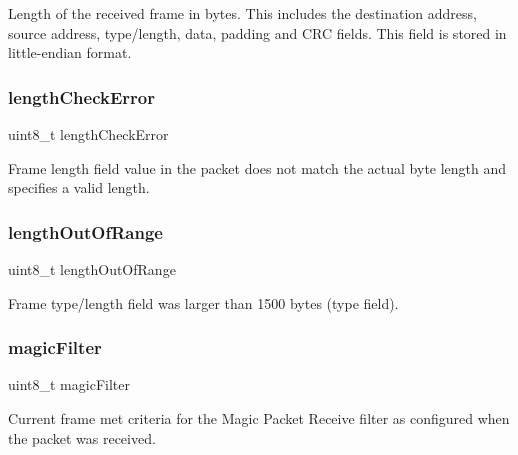 Length of the received frame in bytes. This includes the destination address, source address, type/length, data, padding and C\+RC fields. This field is stored in little-\/endian format. \mbox{\label{struct_r_s_v__t_aa1ee2560cad39e2579609aa0bbe23622}} 
\subsubsection{\texorpdfstring{lengthCheckError}{lengthCheckError}}
{\footnotesize\ttfamily uint8\+\_\+t length\+Check\+Error}



Frame length field value in the packet does not match the actual byte length and specifies a valid length. 

\mbox{\label{struct_r_s_v__t_addceef1c25a3a79f0809d2088d7fad31}} 
\subsubsection{\texorpdfstring{lengthOutOfRange}{lengthOutOfRange}}
{\footnotesize\ttfamily uint8\+\_\+t length\+Out\+Of\+Range}



Frame type/length field was larger than 1500 bytes (type field). 

\mbox{\label{struct_r_s_v__t_a1369352b01723f3fe85ae1504216e1fa}} 
\subsubsection{\texorpdfstring{magicFilter}{magicFilter}}
{\footnotesize\ttfamily uint8\+\_\+t magic\+Filter}



Current frame met criteria for the Magic Packet Receive filter as configured when the packet was received. 

\mbox{\label{struct_r_s_v__t_ab40062c1424a2dfaf51425eb5f3ebb6e}} 
